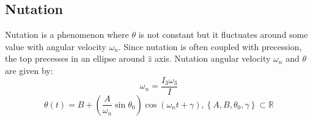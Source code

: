 \begin{multicols}{2}
\subsection{Nutation}
\label{sec:theory:nutation}

Nutation is a phenomenon where $\theta$ is not constant but it fluctuates around some value with angular velocity $\omega_{n}$. Since nutation is often coupled with precession, the top precesses in an ellipse around $\hat{z}$ axis. Nutation angular velocity $\omega_{n}$ and $\theta$ are given by:
\begin{equation}
  \label{eq:theory:nutation_frequency}
  \omega_{n} = \frac{I_{3}\omega_3}{I}
\end{equation}
\begin{equation*}
  \theta(t) = B + (\frac{A}{\omega_n}\sin \theta_{0})\cos(\omega_{n}t + \gamma), \left\{ A, B, \theta_{0}, \gamma \right\} \subset \mathbb{R}
\end{equation*}

\end{multicols}
